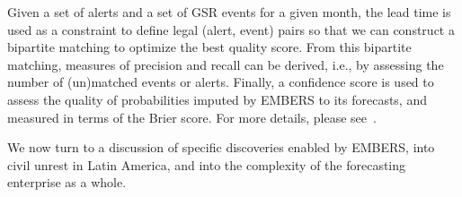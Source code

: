 Given a set of alerts and a set of
GSR events for a given month, the lead time is used as a constraint to define legal (alert, event) pairs so that
we can construct a bipartite matching to optimize the best quality
score. From this bipartite matching,
measures of precision and recall can be derived, i.e., by assessing the number of (un)matched events or
alerts. Finally, a confidence score is used to assess the quality of probabilities imputed by EMBERS to its
forecasts, and measured in terms of the Brier score. For more details, please
see~\cite{kdd:beating-the-news}.

We now turn to a discussion of specific discoveries enabled by EMBERS, into civil unrest in Latin America, and into
the complexity of the forecasting enterprise as a whole.

